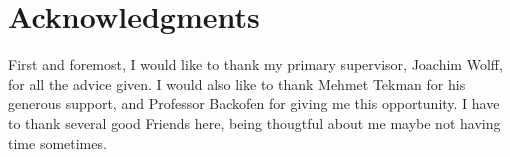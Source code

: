 \chapter{Acknowledgments}

First and foremost, I would like to thank my primary supervisor, Joachim Wolff,
for all the advice given. I would also like to thank Mehmet Tekman for his
generous support, and Professor Backofen for giving me this opportunity. I have
to thank several good Friends here, being thougtful about me maybe not having
time sometimes.

%
